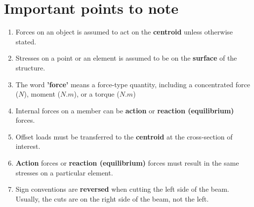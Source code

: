 \documentclass[11pt]{article}
\begin{document}
\section{Important points to note}
\label{sec:org32bbcab}
\begin{enumerate}
\item Forces on an object is assumed to act on the \textbf{centroid} unless otherwise stated.
\item Stresses on a point or an element is assumed to be on the \textbf{surface} of the structure.
\item The word \textbf{'force'} means a force-type quantity, including a concentrated force (\(\unit{N}\)), moment (\(\unit{N.m}\)), or a torque (\(\unit{N.m}\))
\item Internal forces on a member can be \textbf{action} or \textbf{reaction (equilibrium)} forces.
\item Offset loads must be transferred to the \textbf{centroid} at the cross-section of interest.
\item \textbf{Action} forces or \textbf{reaction (equilibrium)} forces must result in the same stresses on a particular element.
\item Sign conventions are \textbf{reversed} when cutting the left side of the beam. Usually, the cuts are on the right side of the beam, not the left.
\end{enumerate}
\end{document}
